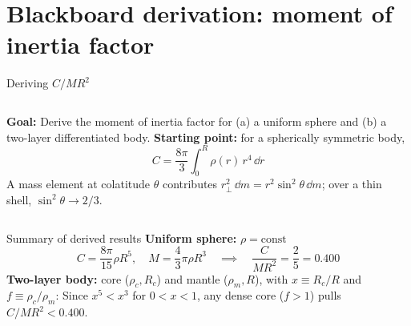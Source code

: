 \documentclass[aspectratio=169, 11pt]{beamer}
\begin{document}
\section{Blackboard derivation: moment of inertia factor}

\begin{frame}{Deriving $C/MR^2$}
  \begin{columns}[c]
    \column{\recapfigcolnarrow}

    \column{\recaptextcolwide}
    \textbf{Goal:} Derive the moment of inertia factor for (a) a uniform sphere and (b) a two-layer differentiated body.
    \vskip6pt
    \textbf{Starting point:} for a spherically symmetric body,
    $$C = \frac{8\pi}{3}\int_0^R \rho(r)\,r^4\,\dd r$$
    A mass element at colatitude $\theta$ contributes $r_\perp^2\,\dd m = r^2\sin^2\theta\,\dd m$; over a thin shell, $\sin^2\theta \to 2/3$.
  \end{columns}
\end{frame}

\begin{frame}{Summary of derived results}
  \textbf{Uniform sphere:} $\rho = \text{const}$
  $$C = \frac{8\pi}{15}\rho R^5, \quad M = \frac{4}{3}\pi\rho R^3 \quad \implies \quad \frac{C}{MR^2} = \frac{2}{5} = 0.400$$
  \vskip6pt
  \textbf{Two-layer body:} core ($\rho_c, R_c$) and mantle ($\rho_m, R$), with $x \equiv R_c/R$ and $f \equiv \rho_c/\rho_m$:
  \vskip4pt
  Since $x^5 < x^3$ for $0 < x < 1$, any dense core ($f > 1$) pulls $C/MR^2 < 0.400$.
\end{frame}

\begin{frame}
\end{frame}
\end{document}
